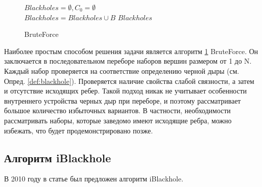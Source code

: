 \documentclass[12pt,a4paper,oneside,openany]{article}
\theoremstyle{definition}
\theoremstyle{lemma}
\theoremstyle{remark}
\begin{document}
\linespread{1.0}
\begin{figure}[H]
	\begin{center}
		\begin{algorithm}[H]
			\SetAlgoLined

                        $Blackholes = \emptyset, C_0 = \emptyset$ \\
                         {
                             {
                                 {
                                     {
                                        $Blackholes = Blackholes \cup B$
                                    }
                                }
                            }
                        }
                        \Return $Blackholes$
			\label{alg:bruteforce}
			\caption{BruteForce}
		\end{algorithm}
	\end{center}
\end{figure}
\linespread{1.5}

Наиболее простым способом решения задачи является алгоритм \ref{alg:bruteforce} BruteForce.
Он заключается в последовательном переборе наборов вершин размером от 1 до N.
Каждый набор проверяется на соответствие определению черной дыры (см. Опред. \ref{def:blackhole}).
Проверяется наличие свойства слабой связности, а затем и отсутствие исходящих ребер.
Такой подход никак не учитывает особенности внутреннего устройства черных дыр при переборе,
и поэтому рассматривает большое количество избыточных вариантов.
В частности, необходимости рассматривать наборы, которые заведомо имеют исходящие ребра, можно избежать, что будет продемонстрировано позже.

\subsection{Алгоритм iBlackhole}\label{subsec:iblackhole}

В 2010 году в статье \cite{li2010detecting} был предложен алгоритм iBlackhole.
\end{document}
